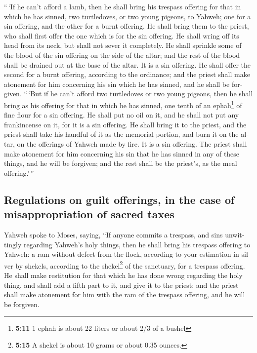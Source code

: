 \begin{paracol}{2}
\begin{otherlanguage}{english}
 ``\,`If he can't afford a lamb, then he shall bring his
trespass offering for that in which he has sinned, two turtledoves, or
two young pigeons, to Yahweh; one for a sin offering, and the other for
a burnt offering.  He shall bring them to the priest, who
shall first offer the one which is for the sin offering. He shall wring
off its head from its neck, but shall not sever it completely.
 He shall sprinkle some of the blood of the sin offering
on the side of the altar; and the rest of the blood shall be drained out
at the base of the altar. It is a sin offering.  He shall
offer the second for a burnt offering, according to the ordinance; and
the priest shall make atonement for him concerning his sin which he has
sinned, and he shall be forgiven.  ``\,`But if he can't
afford two turtledoves or two young pigeons, then he shall bring as his
offering for that in which he has sinned, one tenth of an
ephah\footnote{\textbf{5:11} 1 ephah is about 22 liters or about 2/3 of
  a bushel} of fine flour for a sin offering. He shall put no oil on it,
and he shall not put any frankincense on it, for it is a sin offering.
 He shall bring it to the priest, and the priest shall
take his handful of it as the memorial portion, and burn it on the
altar, on the offerings of Yahweh made by fire. It is a sin offering.
 The priest shall make atonement for him concerning his
sin that he has sinned in any of these things, and he will be forgiven;
and the rest shall be the priest's, as the meal offering.'\,''

\hypertarget{regulations-on-guilt-offerings-in-the-case-of-misappropriation-of-sacred-taxes}{%
\subsection{Regulations on guilt offerings, in the case of
misappropriation of sacred
taxes}\label{regulations-on-guilt-offerings-in-the-case-of-misappropriation-of-sacred-taxes}}

 Yahweh spoke to Moses, saying,  ``If
anyone commits a trespass, and sins unwittingly regarding Yahweh's holy
things, then he shall bring his trespass offering to Yahweh: a ram
without defect from the flock, according to your estimation in silver by
shekels, according to the shekel\footnote{\textbf{5:15} A shekel is
  about 10 grams or about 0.35 ounces.} of the sanctuary, for a trespass
offering.  He shall make restitution for that which he
has done wrong regarding the holy thing, and shall add a fifth part to
it, and give it to the priest; and the priest shall make atonement for
him with the ram of the trespass offering, and he will be forgiven.


\end{otherlanguage}
\end{paracol}

